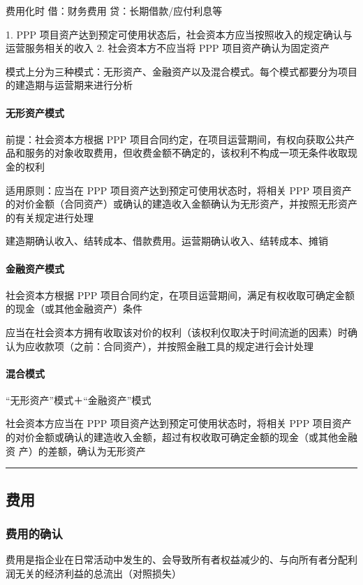 \documentclass[UTF8,12pt]{ctexart}
\numberwithin{equation}{section} %
\numberwithin{figure}{section}
\numberwithin{table}{section}
\begin{document}
	费用化时
	借：财务费用
	贷：长期借款/应付利息等
	
	1.	PPP 项目资产达到预定可使用状态后，社会资本方应当按照收入的规定确认与运营服务相关的收入
	2.	社会资本方不应当将 PPP 项目资产确认为固定资产
	
	模式上分为三种模式：无形资产、金融资产以及混合模式。每个模式都要分为项目的建造期与运营期来进行分析
	
	\paragraph{无形资产模式}前提：社会资本方根据 PPP 项目合同约定，在项目运营期间，有权向获取公共产品和服务的对象收取费用，但收费金额不确定的，该权利不构成一项无条件收取现金的权利
	
	适用原则：应当在 PPP 项目资产达到预定可使用状态时，将相关 PPP 项目资产的对价金额（合同资产）或确认的建造收入金额确认为无形资产，并按照无形资产的有关规定进行处理
	
	建造期确认收入、结转成本、借款费用。运营期确认收入、结转成本、摊销
	
	\paragraph{金融资产模式}
	社会资本方根据 PPP 项目合同约定，在项目运营期间，满足有权收取可确定金额的现金（或其他金融资产）条件
	
	应当在社会资本方拥有收取该对价的权利（该权利仅取决于时间流逝的因素）时确认为应收款项（之前：合同资产），并按照金融工具的规定进行会计处理
	
	\paragraph{混合模式}
	“无形资产”模式＋“金融资产”模式
	
	社会资本方应当在 PPP 项目资产达到预定可使用状态时，将相关 PPP 项目资产的对价金额或确认的建造收入金额，超过有权收取可确定金额的现金（或其他金融资 产）的差额，确认为无形资产
	
	\vspace{5pt}
	\hrule
	\vspace{5pt}
	
	
	\subsection{费用}
	\subsubsection{费用的确认}
	费用是指企业在日常活动中发生的、会导致所有者权益减少的、与向所有者分配利润无关的经济利益的总流出（对照损失）
	
\end{document}
